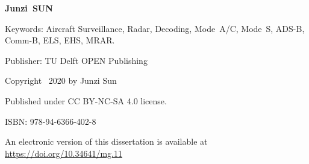 \begin{titlepage}

\thispagestyle{empty}

\vspace*{2\bigskipamount}

{\makeatletter
\titlestyle\bfseries\Huge\@title
\makeatother}

{\makeatletter
\ifx\@subtitle\undefined\else
    \bigskip
    \titlefont\titleshape\LARGE\@subtitle
\fi
\makeatother}


\vspace*{8\bigskipamount}


\makeatletter
{\huge\titlefont\bfseries{Junzi}\ {SUN}}
\makeatother

\vspace*{8\bigskipamount}

\makeatletter
{\large{}}
\makeatother


\clearpage


\thispagestyle{empty}

\vspace*{25\bigskipamount}



Keywords: Aircraft Surveillance, Radar, Decoding, Mode~A/C, Mode~S, ADS-B, Comm-B, ELS, EHS, MRAR.

\medskip

Publisher: TU Delft OPEN Publishing

\vspace{4\bigskipamount}


Copyright \textcopyright\ 2020 by Junzi Sun

\medskip

Published under CC BY-NC-SA 4.0 license.

\medskip
ISBN: 978-94-6366-402-8

\medskip
\medskip
An electronic version of this dissertation is available at \\
\url{https://doi.org/10.34641/mg.11}

\end{titlepage}